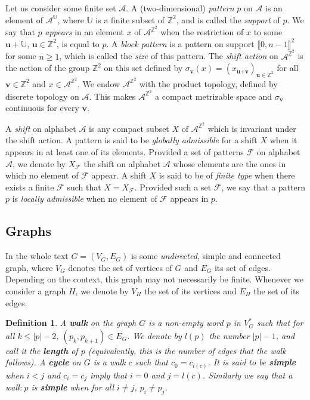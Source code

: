 \documentclass{article}
\newtheorem{definition}[theorem]{Definition}
\begin{document}
Let us consider some finite set $\mathcal{A}$. A (two-dimensional) \textit{pattern} $p$ on $\mathcal{A}$ is an element of $\mathcal{A}^{\mathbb{U}}$, where $\mathbb{U}$ is a finite subset of $\mathbb{Z}^2$, and is called the \textit{support} of $p$. We say that $p$ \textit{appears} in an element $x$ of $\mathcal{A}^{\mathbb{Z}^2}$ when the restriction of $x$ to some $\textbf{u} + \mathbb{U}$, $\textbf{u} \in \mathbb{Z}^2$, is equal to $p$. 
A \textit{block pattern} is a pattern on support $\llbracket 0, n-1\rrbracket^2$ for some $n \ge 1$, which is called the \textit{size} of this pattern. 
The \textit{shift action} on $\mathcal{A}^{\mathbb{Z}^2}$ is the 
action of the group $\mathbb{Z}^2$ on this set defined by 
$\sigma_{\textbf{v}}(x) = (x_{\textbf{u}+\textbf{v}})_{\textbf{u} \in \mathbb{Z}^2}$ for all $\textbf{v} \in \mathbb{Z}^2$ and $x \in \mathcal{A}^{\mathbb{Z}^2}$.
We endow $\mathcal{A}^{\mathbb{Z}^2}$ with the product topology, defined by discrete topology on $\mathcal{A}$. This makes $\mathcal{A}^{\mathbb{Z}^2}$ a compact metrizable space and $\sigma_{\textbf{v}}$ continuous for every $\textbf{v}$.

A \textit{shift} on alphabet $\mathcal{A}$ is %
any compact subset $X$ of $\mathcal{A}^{\mathbb{Z}^2}$ which is  invariant under the shift action. A pattern is said to be \textit{globally admissible} for a shift $X$ when it appears in at least one of its elements.
Provided a set of patterns $\mathcal{F}$ on alphabet $\mathcal{A}$, we denote by $X_{\mathcal{F}}$ the shift on alphabet $\mathcal{A}$ whose elements are the ones in which no element of $\mathcal{F}$ appear. 
A shift $X$ is said to be of \textit{finite type} when there exists a finite $\mathcal{F}$ such 
that $X=X_{\mathcal{F}}$. Provided such a set $\mathcal{F}$, we say that a pattern $p$ is \textit{locally admissible} when no element of $\mathcal{F}$ appears in $p$. 

\subsection{Graphs}
In the whole text $G = (V_G,E_G)$ is some \textit{undirected}, simple and connected graph, where $V_G$ denotes the set of vertices of $G$ and $E_G$ its set of edges. Depending on the context, this graph may not necessarily be finite. Whenever we consider a graph $H$, we denote by $V_H$ the set of its vertices and $E_H$ the set of its edges. 

\begin{definition}
A \textbf{walk} on the graph $G$ is a non-empty word $p$ in $V_G^{*}$ such that for all $k \le |p|-2$, $(p_k, p_{k+1}) \in E_G$. We denote by $l(p)$ the number $|p|-1$, and call it the \textbf{length} of $p$ (equivalently, this is the number of edges that the walk follows). A \textbf{cycle} on $G$ is a walk $c$ 
such that $c_0 = c_{l(c)}$. It is said to be \textbf{simple} when $i < j$ and $c_i = c_j$ imply that $i= 0$ and $j = l(c)$. Similarly we say that a walk $p$ is  \textbf{simple} when for all $i \neq j$, $p_i \neq p_j$.
\end{definition}
\end{document}
